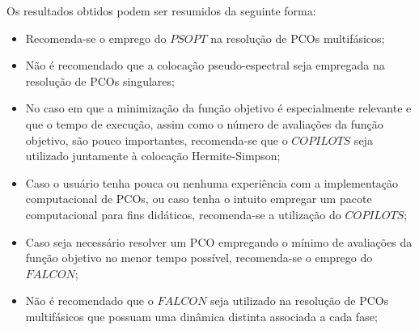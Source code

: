
Os resultados obtidos podem ser resumidos da seguinte forma:
\begin{itemize}
	\item Recomenda-se o emprego do $ PSOPT $ na resolução de PCOs multifásicos;
	\item Não é recomendado que a colocação pseudo-espectral seja empregada na resolução de PCOs singulares;
	\item No caso em que a minimização da função objetivo é especialmente relevante e que o tempo de execução, assim como o número de avaliações da função objetivo, são pouco importantes, recomenda-se que o $ COPILOTS $ seja utilizado juntamente à colocação Hermite-Simpson;
	\item Caso o usuário tenha pouca ou nenhuma experiência com a implementação computacional de PCOs, ou caso tenha o intuito empregar um pacote computacional para fins didáticos, recomenda-se a utilização do $ COPILOTS $;
	\item Caso seja necessário resolver um PCO empregando o mínimo de avaliações da função objetivo no menor tempo possível, recomenda-se o emprego do $ FALCON $;
	\item Não é recomendado que o $ FALCON $ seja utilizado na resolução de PCOs multifásicos que possuam uma dinâmica distinta associada a cada fase;
\end{itemize}